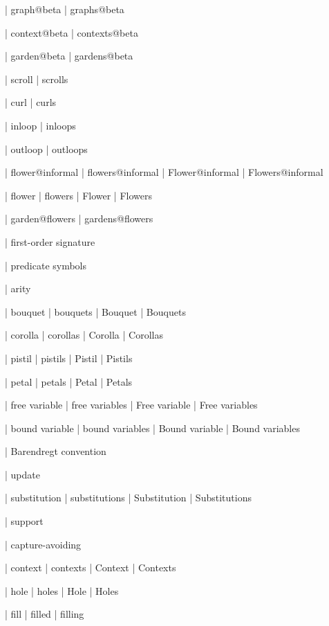  | graph@beta
 | graphs@beta

 | context@beta
 | contexts@beta

 | garden@beta
 | gardens@beta


 | scroll
 | scrolls

 | curl
 | curls

 | inloop
 | inloops

 | outloop
 | outloops

 | flower@informal
 | flowers@informal
 | Flower@informal
 | Flowers@informal

 | flower
 | flowers
 | Flower
 | Flowers

 | garden@flowers
 | gardens@flowers

 | first-order signature

 | predicate symbols

 | arity

 | bouquet
 | bouquets
 | Bouquet
 | Bouquets

 | corolla
 | corollas
 | Corolla
 | Corollas

 | pistil
 | pistils
 | Pistil
 | Pistils

 | petal
 | petals
 | Petal
 | Petals

 | free variable
 | free variables
 | Free variable
 | Free variables

 | bound variable
 | bound variables
 | Bound variable
 | Bound variables

 | Barendregt convention

 | update

 | substitution
 | substitutions
 | Substitution
 | Substitutions

 | support

 | capture-avoiding

 | context
 | contexts
 | Context
 | Contexts

 | hole
 | holes
 | Hole
 | Holes

 | fill
 | filled
 | filling

